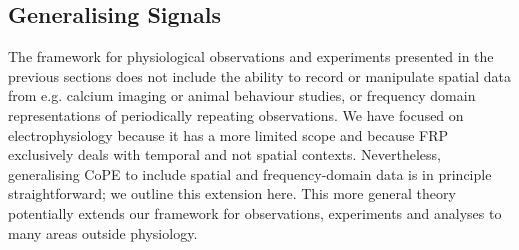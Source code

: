 \subsection*{Generalising Signals}
\label{sec-gensig}


The framework for physiological observations and experiments presented
in the previous sections does not include the ability to record or
manipulate spatial data from e.g. calcium imaging or animal behaviour studies,
or frequency domain representations of periodically repeating
observations. We have focused on electrophysiology because it has a
more limited scope and because FRP exclusively deals with temporal and
not spatial contexts. Nevertheless, generalising CoPE to include
spatial and frequency-domain data is in principle straightforward;
we outline this extension here. This more general theory potentially extends
our framework for observations, experiments and analyses to many areas outside
physiology.

